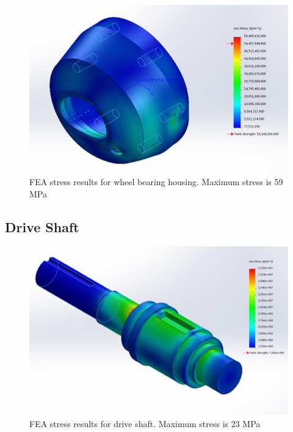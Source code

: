 \begin{figure}[H]
\centering
\includegraphics[width=\textwidth]{images/wheel_hub_fea}
\caption[Wheel Bearing Housing FEA Stress Results]{FEA stress results for wheel bearing housing. Maximum stress is 59 MPa}
\label{fig:wheel_hub_stress_fea}
\end{figure}


\subsection{Drive Shaft}\label{sec:drive_shaft_fea}

\begin{figure}[H]
\centering
\includegraphics[width=\textwidth]{images/FEA_driveShaft}
\caption[Drive Shaft FEA Stress Results]{FEA stress results for drive shaft. Maximum stress is 23 MPa}
\label{fig:wheel_shaft_stress_fea}
\end{figure}

